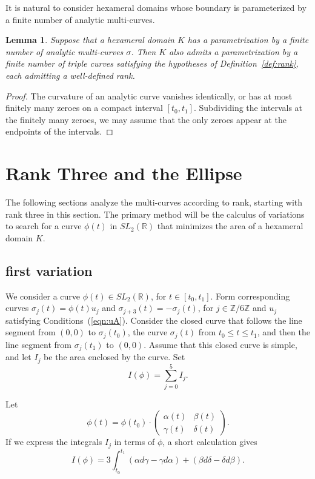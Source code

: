 \documentclass[11pt]{amsart}
\newtheorem{lemma}[equation]{Lemma}
\newcommand{\ring}[1]{\mathbb{#1}}
\begin{document}
It is natural to consider hexameral domains whose boundary is
parameterized by a finite number of  analytic multi-curves.  

\begin{lemma} Suppose that a hexameral domain $K$ has a
  parametrization by a finite number of analytic multi-curves
  $\sigma$.  Then $K$ also admits a parametrization by a finite number
  of triple curves satisfying the hypotheses of
  Definition~\ref{def:rank}, each admitting a well-defined rank.
\end{lemma}

\begin{proof} The curvature of an analytic curve vanishes identically,
or has at most finitely many zeroes on a compact interval $[t_0,t_1]$.
Subdividing the intervals at the finitely many zeroes, we may assume
that the only zeroes appear at the endpoints of the intervals.
\end{proof}




\section{Rank Three and the Ellipse}

The following sections analyze the multi-curves according to rank,
starting with rank three in this section.
The primary method will be the calculus of variations  
to search for a curve $\phi(t)$ in $SL_2(\ring{R})$ that 
minimizes the area of a hexameral domain $K$.  

\subsection{first variation}

We consider a curve $\phi(t)\in SL_2(\ring{R})$, for $t\in[t_0,t_1]$.
Form corresponding curves $\sigma_j(t) = \phi(t) u_j$ and
$\sigma_{j+3}(t) = -\sigma_j(t)$, for $j\in\ring{Z}/6\ring{Z}$ and
$u_j$ satisfying Conditions~(\ref{eqn:uA}).  Consider the closed curve
that follows the line segment from $(0,0)$ to $\sigma_j(t_0)$, the
curve $\sigma_j(t)$ from $t_0\le t\le t_1$, and then the line segment
from $\sigma_j(t_1)$ to $(0,0)$.  Assume that this closed curve is
simple, and let $I_j$ be the area enclosed by the curve.  Set
$$I(\phi) =\sum_{j=0}^5 I_j.$$

Let 
$$
\phi(t) = \phi(t_0)\cdot \begin{pmatrix} \alpha(t) & \beta(t) \\ \gamma(t) & \delta (t) \end{pmatrix}.
$$
If we express the integrals $I_j$ in terms of $\phi$, a short calculation gives
\begin{equation}\label{eqn:area-int}
I(\phi) = 3\int_{t_0}^{t_1} (\alpha d\gamma - \gamma d\alpha) + (\beta d\delta - \delta d\beta).
\end{equation}
\end{document}
